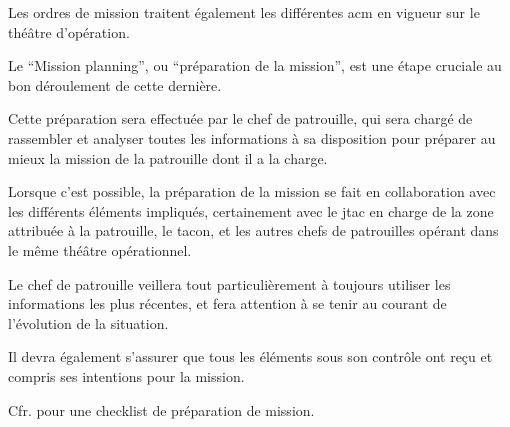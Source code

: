 Les ordres de mission traitent également les différentes \gls{acm} en vigueur sur le théâtre d'opération.

\begin{e1}
	\item Le ``Mission planning'', ou ``préparation de la mission'', est une étape cruciale au bon déroulement de cette dernière.
	\item Cette préparation sera effectuée par le chef de patrouille, qui sera chargé de rassembler et analyser toutes les informations à sa disposition pour préparer au mieux la mission de la patrouille dont il a la charge.
	\item Lorsque c'est possible, la préparation de la mission se fait en collaboration avec les différents éléments impliqués, certainement avec le \gls{jtac} en charge de la zone attribuée à la patrouille, le \gls{tacon}, et les autres chefs de patrouilles opérant dans le même théâtre opérationnel.
	\item Le chef de patrouille veillera tout particulièrement à toujours utiliser les informations les plus récentes, et fera attention à se tenir au courant de l'évolution de la situation.
	\item Il devra également s'assurer que tous les éléments sous son contrôle ont reçu et compris ses intentions pour la mission.
	\item Cfr.  pour une checklist de préparation de mission.
\end{e1}



